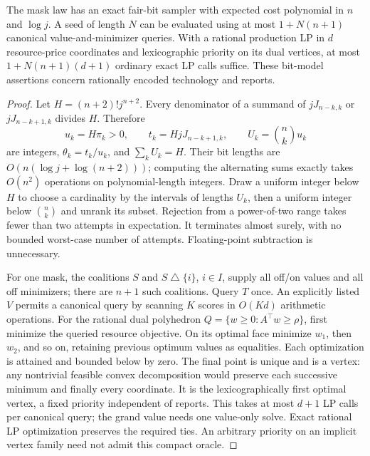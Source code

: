 \begin{proposition}\label{alg:cost}
The mask law has an exact fair-bit sampler with expected cost polynomial in
$n$ and $\log j$.  A seed of length $N$ can be evaluated using at most
$1+N(n+1)$ canonical value-and-minimizer queries.  With a rational production
LP in $d$ resource-price coordinates and lexicographic priority on its dual
vertices, at most $1+N(n+1)(d+1)$ ordinary exact LP calls suffice.
These bit-model assertions concern rationally encoded technology and reports.
\end{proposition}
\begin{proof}
Let $H=(n+2)!j^{n+2}$.  Every denominator of a summand of
$jJ_{n-k,k}$ or $jJ_{n-k+1,k}$ divides $H$.  Therefore
\[
 u_k=H\pi_k>0,\qquad t_k=HjJ_{n-k+1,k},\qquad
 U_k=\binom nk u_k
\]
are integers, $\theta_k=t_k/u_k$, and $\sum_kU_k=H$.
Their bit lengths are $O(n(\log j+\log(n+2)))$; computing the alternating
sums exactly takes $O(n^2)$ operations on polynomial-length integers.
Draw a uniform integer below $H$ to choose a cardinality by the intervals
of lengths $U_k$, then a uniform integer below $\binom nk$ and unrank its
subset.  Rejection from a power-of-two range takes fewer than two attempts
in expectation.  It terminates almost surely, with no bounded worst-case
number of attempts.  Floating-point subtraction is unnecessary.

For one mask, the coalitions $S$ and $S\mathbin{\triangle}\{i\}$,
$i\in I$, supply all off/on values and all off minimizers; there are $n+1$
such coalitions.  Query $T$ once.  An explicitly listed $V$ permits a canonical
query by scanning $K$ scores in $O(Kd)$ arithmetic operations.
For the rational dual polyhedron $Q=\{w\ge0:A^\top w\ge\rho\}$,
first minimize the queried resource objective.  On its optimal face minimize
$w_1$, then $w_2$, and so on, retaining previous optimum values as equalities.
Each optimization is attained and bounded below by zero.  The final point
is unique and is a vertex: any nontrivial feasible convex decomposition
would preserve each successive minimum and finally every coordinate.
It is the lexicographically first optimal vertex, a fixed priority independent
of reports.  This takes at most $d+1$ LP calls per canonical query; the grand
value needs one value-only solve.  Exact rational LP optimization preserves
the required ties.  An arbitrary priority on an implicit vertex family need
not admit this compact oracle.
\end{proof}


